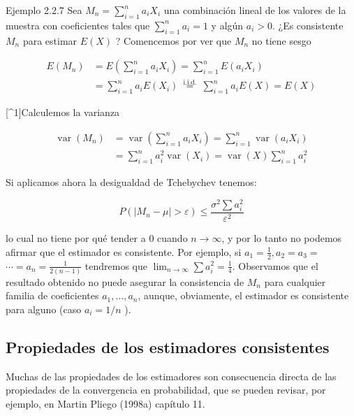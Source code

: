 \documentclass[
]{article}
\begin{document}
Ejemplo 2.2.7 Sea \(M_{n}=\sum_{i=1}^{n} a_{i} X_{i}\) una combinación lineal de los valores de la muestra con coeficientes tales que \(\sum_{i=1}^{n} a_{i}=1\) y algún \(a_{i}>0\). ¿Es consistente \(M_{n}\) para estimar \(E(X)\) ?
Comencemos por ver que \(M_{n}\) no tiene sesgo

\[
\begin{aligned}
E\left(M_{n}\right) & =E\left(\sum_{i=1}^{n} a_{i} X_{i}\right)=\sum_{i=1}^{n} E\left(a_{i} X_{i}\right) \\
& =\sum_{i=1}^{n} a_{i} E\left(X_{i}\right) \stackrel{\text { i.i.d. }}{=} \sum_{i=1}^{n} a_{i} E(X)=E(X)
\end{aligned}
\]

{[}\^{}1{]}Calculemos la varianza

\[
\begin{aligned}
\operatorname{var}\left(M_{n}\right) & =\operatorname{var}\left(\sum_{i=1}^{n} a_{i} X_{i}\right)=\sum_{i=1}^{n} \operatorname{var}\left(a_{i} X_{i}\right) \\
& =\sum_{i=1}^{n} a_{i}^{2} \operatorname{var}\left(X_{i}\right)=\operatorname{var}(X) \sum_{i=1}^{n} a_{i}^{2}
\end{aligned}
\]

Si aplicamos ahora la desigualdad de Tchebychev tenemos:

\[
P\left(\left|M_{n}-\mu\right|>\varepsilon\right) \leq \frac{\sigma^{2} \sum a_{i}^{2}}{\varepsilon^{2}}
\]

lo cual no tiene por qué tender a 0 cuando \(n \rightarrow \infty\), y por lo tanto no podemos afirmar que el estimador es consistente. Por ejemplo, si \(a_{1}=\frac{1}{2}, a_{2}=a_{3}=\) \(\cdots=a_{n}=\frac{1}{2(n-1)}\) tendremos que \(\lim _{n \rightarrow \infty} \sum a_{i}^{2}=\frac{1}{4}\).
Observamos que el resultado obtenido no puede asegurar la consistencia de \(M_{n}\) para cualquier familia de coeficientes \(a_{1}, \ldots, a_{n}\), aunque, obviamente, el estimador es consistente para alguno (caso \(a_{i}=1 / n\) ).

\subsection{Propiedades de los estimadores consistentes}\label{propiedades-de-los-estimadores-consistentes}

Muchas de las propiedades de los estimadores son consecuencia directa de las propiedades de la convergencia en probabilidad, que se pueden revisar, por ejemplo, en Martin Pliego (1998a) capítulo 11.
\end{document}
